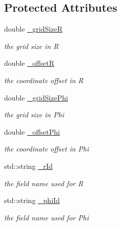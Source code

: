 \subsection*{Protected Attributes}
\begin{DoxyCompactItemize}
\item 
double \hyperlink{class_d_d4hep_1_1_d_d_segmentation_1_1_polar_grid_r_phi_a3f8b1d0889b592d5f6b08a27ef376c18}{\_\-gridSizeR}
\begin{DoxyCompactList}\small\item\em the grid size in R \item\end{DoxyCompactList}\item 
double \hyperlink{class_d_d4hep_1_1_d_d_segmentation_1_1_polar_grid_r_phi_aea2278c6ee89eedb09b9ef2fce3a8de0}{\_\-offsetR}
\begin{DoxyCompactList}\small\item\em the coordinate offset in R \item\end{DoxyCompactList}\item 
double \hyperlink{class_d_d4hep_1_1_d_d_segmentation_1_1_polar_grid_r_phi_abf48a7497f4d676d89b36371e4cf0af7}{\_\-gridSizePhi}
\begin{DoxyCompactList}\small\item\em the grid size in Phi \item\end{DoxyCompactList}\item 
double \hyperlink{class_d_d4hep_1_1_d_d_segmentation_1_1_polar_grid_r_phi_aad87313faf21c764d78f84130c87c178}{\_\-offsetPhi}
\begin{DoxyCompactList}\small\item\em the coordinate offset in Phi \item\end{DoxyCompactList}\item 
std::string \hyperlink{class_d_d4hep_1_1_d_d_segmentation_1_1_polar_grid_r_phi_a8a4e4aea0a7943c8e77c1f9c8bdc5ffc}{\_\-rId}
\begin{DoxyCompactList}\small\item\em the field name used for R \item\end{DoxyCompactList}\item 
std::string \hyperlink{class_d_d4hep_1_1_d_d_segmentation_1_1_polar_grid_r_phi_aeb72e70920f4eb466de969281d984053}{\_\-phiId}
\begin{DoxyCompactList}\small\item\em the field name used for Phi \item\end{DoxyCompactList}\end{DoxyCompactItemize}


